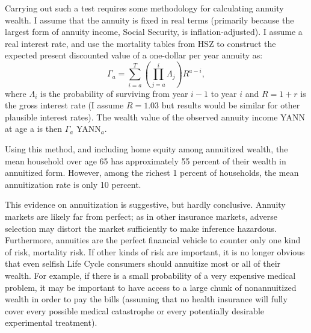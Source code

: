 \documentclass[titlepage,12pt]{article}
\begin{document}
Carrying out such a test requires some methodology for calculating 
annuity wealth.  I assume that the annuity is fixed in real terms 
(primarily because the largest form of annuity income, Social 
Security, is inflation-adjusted).  I assume a real interest rate, and 
use the mortality tables from HSZ to construct the expected present 
discounted value of a one-dollar per year annuity as:
\begin{equation}
\Gamma_{a} = \sum_{i=a}^{T} \left(\prod_{j=a}^{i} \Lambda_{j}\right) R^{a-i},
\end{equation}
where $\Lambda_{i}$ is the probability of surviving from year $i-1$ to 
year $i$ and $R=1+r$ is the gross interest rate (I assume $R=1.03$ but 
results would be similar for other plausible interest rates).  The 
wealth value of the observed annuity income YANN at age a is then 
$\Gamma_{a}$ YANN$_{a}$.

Using this method, and including home equity among annuitized wealth, 
the mean household over age 65 has approximately 55 percent of their 
wealth in annuitized form.  However, among the richest 1 percent of 
households, the mean annuitization rate is only 10 percent.  

This evidence on annuitization is suggestive, but hardly conclusive.  
Annuity markets are likely far from perfect; as in other insurance 
markets, adverse selection may distort the market sufficiently to make 
inference hazardous.  Furthermore, annuities are the perfect financial 
vehicle to counter only one kind of risk, mortality risk.  If other 
kinds of risk are important, it is no longer obvious that even selfish 
Life Cycle consumers should annuitize most or all of their wealth.  
For example, if there is a small probability of a very expensive 
medical problem, it may be important to have access to a large chunk 
of nonannuitized wealth in order to pay the bills (assuming that no 
health insurance will fully cover every possible medical catastrophe 
or every potentially desirable experimental treatment).
\end{document}
